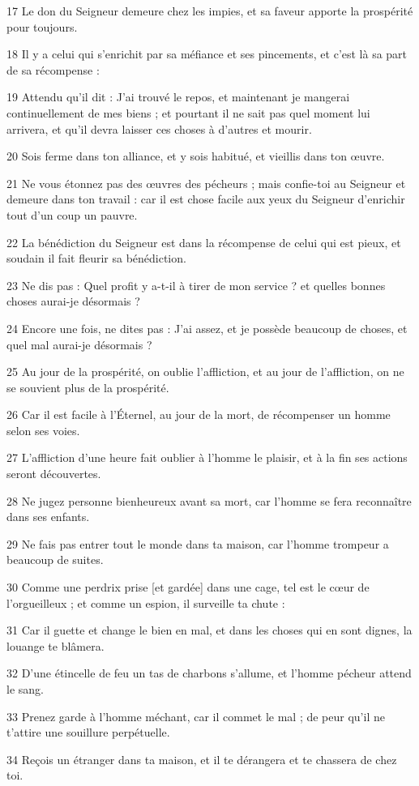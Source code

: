 \par 17 Le don du Seigneur demeure chez les impies, et sa faveur apporte la prospérité pour toujours.
\par 18 Il y a celui qui s'enrichit par sa méfiance et ses pincements, et c'est là sa part de sa récompense :
\par 19 Attendu qu'il dit : J'ai trouvé le repos, et maintenant je mangerai continuellement de mes biens ; et pourtant il ne sait pas quel moment lui arrivera, et qu'il devra laisser ces choses à d'autres et mourir.
\par 20 Sois ferme dans ton alliance, et y sois habitué, et vieillis dans ton œuvre.
\par 21 Ne vous étonnez pas des œuvres des pécheurs ; mais confie-toi au Seigneur et demeure dans ton travail : car il est chose facile aux yeux du Seigneur d'enrichir tout d'un coup un pauvre.
\par 22 La bénédiction du Seigneur est dans la récompense de celui qui est pieux, et soudain il fait fleurir sa bénédiction.
\par 23 Ne dis pas : Quel profit y a-t-il à tirer de mon service ? et quelles bonnes choses aurai-je désormais ?
\par 24 Encore une fois, ne dites pas : J'ai assez, et je possède beaucoup de choses, et quel mal aurai-je désormais ?
\par 25 Au jour de la prospérité, on oublie l'affliction, et au jour de l'affliction, on ne se souvient plus de la prospérité.
\par 26 Car il est facile à l'Éternel, au jour de la mort, de récompenser un homme selon ses voies.
\par 27 L'affliction d'une heure fait oublier à l'homme le plaisir, et à la fin ses actions seront découvertes.
\par 28 Ne jugez personne bienheureux avant sa mort, car l'homme se fera reconnaître dans ses enfants.
\par 29 Ne fais pas entrer tout le monde dans ta maison, car l'homme trompeur a beaucoup de suites.
\par 30 Comme une perdrix prise [et gardée] dans une cage, tel est le cœur de l'orgueilleux ; et comme un espion, il surveille ta chute :
\par 31 Car il guette et change le bien en mal, et dans les choses qui en sont dignes, la louange te blâmera.
\par 32 D'une étincelle de feu un tas de charbons s'allume, et l'homme pécheur attend le sang.
\par 33 Prenez garde à l'homme méchant, car il commet le mal ; de peur qu'il ne t'attire une souillure perpétuelle.
\par 34 Reçois un étranger dans ta maison, et il te dérangera et te chassera de chez toi.

